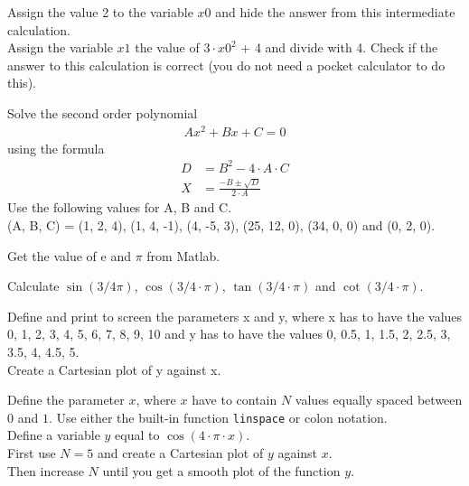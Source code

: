 \begin{ex}
Assign the value 2 to the variable $x0$ and hide the answer from this intermediate
calculation.\\
Assign the variable $x1$ the value of $3 \cdot x0^2$ + 4 and divide with 4. Check if the answer to
this calculation is correct (you do not need a pocket calculator to do this).
\end{ex}
\known{=, \^}


\begin{ex}
Solve the second order polynomial
\begin{align}
A x^2 + B x + C = 0
\end{align}
using the formula
\begin{align}
D & = B^2 - 4 \cdot A \cdot C	\\
X & = \frac{-B\pm \sqrt{D}}{2 \cdot A}
\end{align}
Use the following values for A, B and C.\\ \noindent
(A, B, C) = (1, 2, 4), (1, 4, -1), (4, -5, 3), (25, 12, 0), (34, 0, 0) and (0, 2, 0).
\end{ex}

\begin{ex}
Get the value of e and $\pi$ from Matlab.
\end{ex}

\begin{ex}
Calculate $\sin(3/4\pi)$, $\cos(3/4 \cdot \pi)$, $\tan(3/4 \cdot \pi)$ and $\cot(3/4 \cdot \pi)$.
\end{ex}

\begin{ex}
Define and print to screen the parameters x and y, where x has to have the values 0, 1,
2, 3, 4, 5, 6, 7, 8, 9, 10 and y has to have the values 0, 0.5, 1, 1.5, 2, 2.5, 3, 3.5, 4, 4.5,
5.\\
Create a Cartesian plot of y against x.
\end{ex}


\begin{ex}
Define the parameter $x$, where $x$ have to contain $N$ values equally spaced between $0$
and $1$. Use either the built-in function \texttt{linspace} or colon notation.\\
Define a variable $y$ equal to $\cos(4\cdot \pi \cdot x)$.\\
First use $N = 5$ and create a Cartesian plot of $y$ against $x$.\\
Then increase $N$ until you get a smooth plot of the function $y$.
\end{ex}

